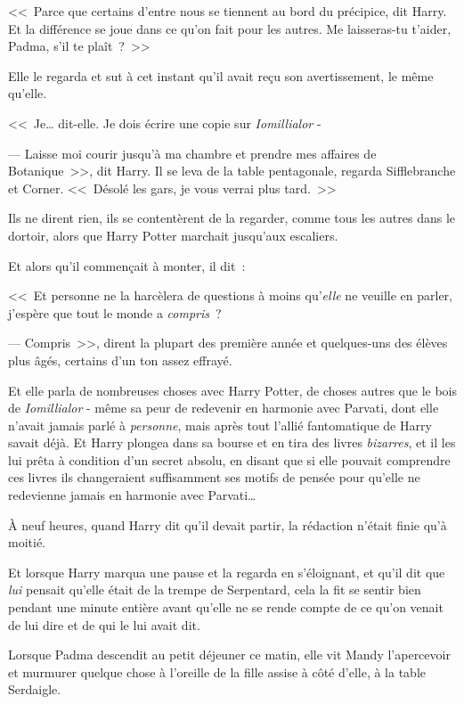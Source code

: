 <<~Parce que certains d'entre nous se tiennent au bord du précipice, dit Harry. Et la différence se joue dans ce qu'on fait pour les autres. Me laisseras-tu t'aider, Padma, s'il te plaît~?~>>

Elle le regarda et sut à cet instant qu'il avait reçu son avertissement, le même qu'elle.

<<~Je… dit-elle. Je dois écrire une copie sur \emph{Iomillialor} -

--- Laisse moi courir jusqu'à ma chambre et prendre mes affaires de Botanique~>>, dit Harry. Il se leva de la table pentagonale, regarda Sifflebranche et Corner. <<~Désolé les gars, je vous verrai plus tard.~>>

Ils ne dirent rien, ils se contentèrent de la regarder, comme tous les autres dans le dortoir, alors que Harry Potter marchait jusqu'aux escaliers.

Et alors qu'il commençait à monter, il dit~:

<<~Et personne ne la harcèlera de questions à moins qu'\emph{elle} ne veuille en parler, j'espère que tout le monde a \emph{compris}~?

--- Compris~>>, dirent la plupart des première année et quelques-uns des élèves plus âgés, certains d'un ton assez effrayé.

\later

Et elle parla de nombreuses choses avec Harry Potter, de choses autres que le bois de \emph{Iomillialor} - même sa peur de redevenir en harmonie avec Parvati, dont elle n'avait jamais parlé à \emph{personne}, mais après tout l'allié fantomatique de Harry savait déjà. Et Harry plongea dans sa bourse et en tira des livres \emph{bizarres}, et il les lui prêta à condition d'un secret absolu, en disant que si elle pouvait comprendre ces livres ils changeraient suffisamment ses motifs de pensée pour qu'elle ne redevienne jamais en harmonie avec Parvati…

À neuf heures, quand Harry dit qu'il devait partir, la rédaction n'était finie qu'à moitié.

Et lorsque Harry marqua une pause et la regarda en s'éloignant, et qu'il dit que \emph{lui} pensait qu'elle était de la trempe de Serpentard, cela la fit se sentir bien pendant une minute entière avant qu'elle ne se rende compte de ce qu'on venait de lui dire et de qui le lui avait dit.

\later

Lorsque Padma descendit au petit déjeuner ce matin, elle vit Mandy l'apercevoir et murmurer quelque chose à l'oreille de la fille assise à côté d'elle, à la table Serdaigle.


